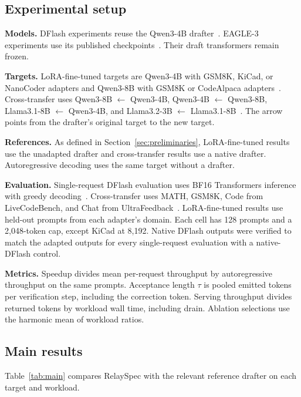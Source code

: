 \subsection{Experimental setup}
\label{sec:setup}

\textbf{Models.} DFlash experiments reuse the Qwen3-4B drafter~\citep{chen2026dflash,yang2025qwen3}. EAGLE-3 experiments use its published checkpoints~\citep{li2025eagle3}. Their draft transformers remain frozen.

\textbf{Targets.} LoRA-fine-tuned targets are Qwen3-4B with GSM8K, KiCad, or NanoCoder adapters and Qwen3-8B with GSM8K or CodeAlpaca adapters~\citep{hu2022lora,chaudhary2023codealpaca}. Cross-transfer uses Qwen3-8B $\leftarrow$ Qwen3-4B, Qwen3-4B $\leftarrow$ Qwen3-8B, Llama3.1-8B $\leftarrow$ Qwen3-4B, and Llama3.2-3B $\leftarrow$ Llama3.1-8B~\citep{grattafiori2024llama3}. The arrow points from the drafter's original target to the new target.

\textbf{References.} As defined in Section~\ref{sec:preliminaries}, LoRA-fine-tuned results use the unadapted drafter and cross-transfer results use a native drafter. Autoregressive decoding uses the same target without a drafter.

\textbf{Evaluation.} Single-request DFlash evaluation uses BF16 Transformers inference with greedy decoding~\citep{wolf2020transformers}. Cross-transfer uses MATH, GSM8K, Code from LiveCodeBench, and Chat from UltraFeedback~\citep{hendrycks2021math,cobbe2021gsm8k,jain2024livecodebench,cui2024ultrafeedback}. LoRA-fine-tuned results use held-out prompts from each adapter's domain. Each cell has 128 prompts and a 2{,}048-token cap, except KiCad at 8{,}192. Native DFlash outputs were verified to match the adapted outputs for every single-request evaluation with a native-DFlash control.

\textbf{Metrics.} Speedup divides mean per-request throughput by autoregressive throughput on the same prompts. Acceptance length $\tau$ is pooled emitted tokens per verification step, including the correction token. Serving throughput divides returned tokens by workload wall time, including drain. Ablation selections use the harmonic mean of workload ratios.

\subsection{Main results}
\label{sec:main-results}
Table~\ref{tab:main} compares RelaySpec with the relevant reference drafter on each target and workload.

